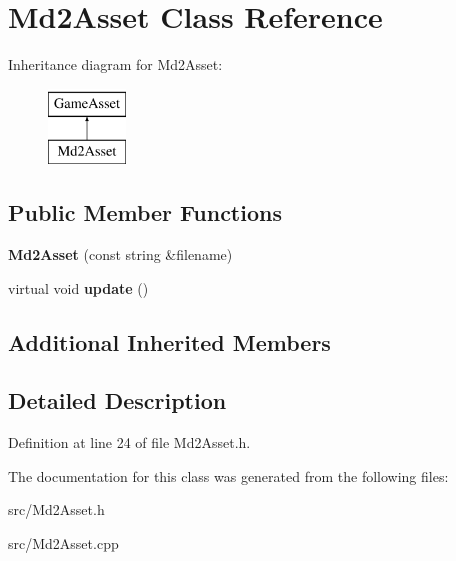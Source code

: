 \hypertarget{classMd2Asset}{\section{Md2\-Asset Class Reference}
\label{classMd2Asset}
}
Inheritance diagram for Md2\-Asset\-:\begin{figure}[H]
\begin{center}
\leavevmode
\includegraphics[height=2.000000cm]{classMd2Asset}
\end{center}
\end{figure}
\subsection*{Public Member Functions}
\begin{DoxyCompactItemize}
\item 
\hypertarget{classMd2Asset_af11c2df6a76c46c7fbcaf128ef2e5ca0}{{\bfseries Md2\-Asset} (const string \&filename)}\label{classMd2Asset_af11c2df6a76c46c7fbcaf128ef2e5ca0}

\item 
\hypertarget{classMd2Asset_a1243a6d23a9a47e5a03b8208ea9a84f5}{virtual void {\bfseries update} ()}\label{classMd2Asset_a1243a6d23a9a47e5a03b8208ea9a84f5}

\end{DoxyCompactItemize}
\subsection*{Additional Inherited Members}


\subsection{Detailed Description}


Definition at line 24 of file Md2\-Asset.\-h.



The documentation for this class was generated from the following files\-:\begin{DoxyCompactItemize}
\item 
src/Md2\-Asset.\-h\item 
src/Md2\-Asset.\-cpp\end{DoxyCompactItemize}
